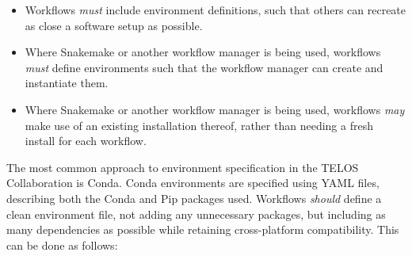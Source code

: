 \documentclass{article}
\newcommand\rfcword[1]{\emph{#1}\xspace}
\newcommand\must{\rfcword{must}}
\newcommand\should{\rfcword{should}}
\newcommand\may{\rfcword{may}}
\begin{document}
\begin{itemize}
  \item
        Workflows \must include environment definitions,
        such that others can recreate as close a software setup as possible.
  \item
        Where Snakemake or another workflow manager is being used,
        workflows \must define environments
        such that the workflow manager can create and instantiate them.
  \item
        Where Snakemake or another workflow manager is being used,
        workflows \may make use of an existing installation thereof,
        rather than needing a fresh install for each workflow.
\end{itemize}

The most common approach to environment specification in the TELOS Collaboration
is Conda.
Conda environments are specified using YAML files,
describing both the Conda and Pip packages used.
Workflows \should define a clean environment file,
not adding any unnecessary packages,
but including as many dependencies as possible
while retaining cross-platform compatibility.
This can be done as follows:
\end{document}
